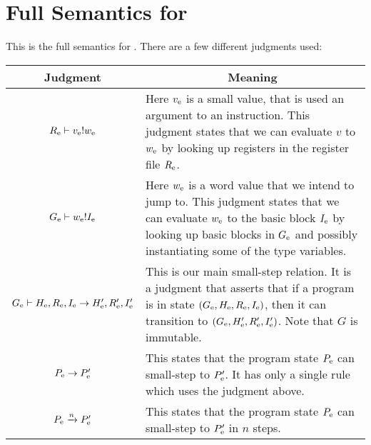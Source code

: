 \chapter{Full Semantics for \ATALe}
\label{sec:full-atale}

This is the full semantics for \ATALe. There are a few different judgments used:

\begin{tabular}{|c|p{7.5 cm}|}
  \hline
  Judgment & \multicolumn{1}{|c|}{Meaning} \\\hline
  ${R_{\mathrm{e}}} |- {v_{\mathrm{e}}} ! {w_{\mathrm{e}}}$ & Here $v_{\mathrm{e}}$ is a small value, that is used an argument to an instruction. This judgment states that we can evaluate $v$ to $w_{\mathrm{e}}$ by looking up registers in the register file $R_{\mathrm{e}}$. \\\hline
  ${G_{\mathrm{e}}} |- {w_{\mathrm{e}}} ! {I_{\mathrm{e}}}$ & Here $w_{\mathrm{e}}$ is a word value that we intend to jump to. This judgment states that we can evaluate $w_{\mathrm{e}}$ to the basic block $I_{\mathrm{e}}$ by looking up basic blocks in $G_{\mathrm{e}}$ and possibly instantiating some of the type variables. \\\hline
  ${G_{\mathrm{e}}} |- {H_{\mathrm{e}}, R_{\mathrm{e}}, I_{\mathrm{e}}} -> {H'_{\mathrm{e}}, R'_{\mathrm{e}}, I'_{\mathrm{e}}}$ & This is our main small-step relation. It is a judgment that asserts that if a program is in state $(G_{\mathrm{e}}, H_{\mathrm{e}}, R_{\mathrm{e}}, I_{\mathrm{e}})$, then it can transition to $(G_{\mathrm{e}}, H'_{\mathrm{e}}, R'_{\mathrm{e}}, I'_{\mathrm{e}})$. Note that $G$ is immutable. \\\hline
  ${P_{\mathrm{e}}} -> {P'_{\mathrm{e}}}$ & This states that the program state $P_{\mathrm{e}}$ can small-step to $P'_{\mathrm{e}}$. It has only a single rule which uses the judgment above. \\\hline
  ${P_{\mathrm{e}}} \xrightarrow{n} {P'_{\mathrm{e}}}$ & This states that the program state $P_{\mathrm{e}}$ can small-step to $P'_{\mathrm{e}}$ in $n$ steps. \\\hline
\end{tabular} \\


